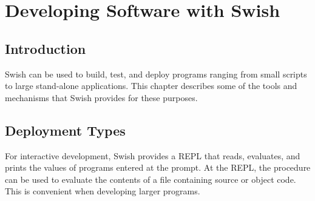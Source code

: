 %
%
%

\chapter {Developing Software with Swish}\label{chap:app}

\section {Introduction}

Swish can be used to build, test, and deploy programs ranging
from small scripts to large stand-alone applications.
This chapter describes some of the tools and mechanisms that Swish provides
for these purposes.


\section {Deployment Types}

For interactive development, Swish provides a REPL that reads, evaluates,
and prints the values of programs entered at the prompt.
At the REPL, the  procedure can be used to evaluate the
contents of a file containing source or object code.
This is convenient when developing larger programs.

